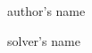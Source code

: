 \documentclass{qmolist}
\begin{document}
\soltrue %
\begin{problem}{author's name}
\end{problem}
\begin{solution*}{solver's name}
\end{solution*}
\begin{remark}
\end{remark}
\end{document}
